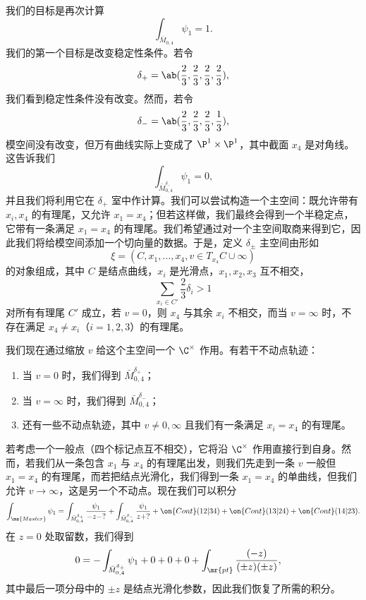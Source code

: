 \begin{exm}[又一个玩具例子]
    我们的目标是再次计算
    \[ \int_{\bar{M}_{0,4}} \psi_1 = 1. \]
    我们的第一个目标是改变稳定性条件。若令
    \[ \delta_+ = \ab(\frac{2}{3}, \frac{2}{3}, \frac{2}{3}, \frac{2}{3}), \]
    我们看到稳定性条件没有改变。然而，若令
    \[ \delta_- = \ab(\frac{2}{3}, \frac{2}{3}, \frac{2}{3}, \frac{1}{3}), \]
    模空间没有改变，但万有曲线实际上变成了 \(\P^1 \times \P^1\)，其中截面 \(x_4\) 是对角线。这告诉我们
    \[ \int_{\bar{M}_{0,4}^{\delta_-}} \psi_1 = 0, \]
    并且我们将利用它在 \(\delta_+\) 室中作计算。我们可以尝试构造一个主空间：既允许带有 \(x_i, x_4\) 的有理尾，又允许 \(x_1 = x_4\)；但若这样做，我们最终会得到一个半稳定点，它带有一条满足 \(x_1 = x_4\) 的有理尾。我们希望通过对一个主空间取商来得到它，因此我们将给模空间添加一个切向量的数据。于是，定义 \(\delta_{\pm}\) 主空间由形如
    \[ \xi = (C, x_1, \ldots, x_4, v \in T_{x_4} C \cup \infty) \]
    的对象组成，其中 \(C\) 是结点曲线，\(x_i\) 是光滑点，\(x_1, x_2, x_3\) 互不相交，
    \[ \sum_{x_i \in C'} \frac{2}{3} \delta_i > 1 \]
    对所有有理尾 \(C'\) 成立，若 \(v = 0\)，则 \(x_4\) 与其余 \(x_i\) 不相交，而当 \(v = \infty\) 时，不存在满足 \(x_4 \neq x_i\)（\(i = 1,2,3\)）的有理尾。 

    我们现在通过缩放 \(v\) 给这个主空间一个 \(\C^{\times}\) 作用。有若干不动点轨迹：
    \begin{enumerate}
        \item 当 \(v = 0\) 时，我们得到 \(\bar{M}_{0,4}^{\delta_+}\)；
        \item 当 \(v = \infty\) 时，我们得到 \(\bar{M}_{0,4}^{\delta_-}\)；
        \item 还有一些不动点轨迹，其中 \(v \neq 0,\infty\) 且我们有一条满足 \(x_i = x_4\) 的有理尾。
    \end{enumerate}

    若考虑一个一般点（四个标记点互不相交），它将沿 \(\C^{\times}\) 作用直接行到自身。然而，若我们从一条包含 \(x_1\) 与 \(x_4\) 的有理尾出发，则我们先走到一条 \(v\) 一般但 \(x_1 = x_4\) 的有理尾，而若把结点光滑化，我们得到一条 \(x_1 = x_4\) 的单曲线，但我们允许 \(v \to \infty\)，这是另一个不动点。现在我们可以积分
    \begin{align*}
        \int_{\ms{Master}} \psi_1 = \int_{\bar{M}_{0,4}^{\delta_+}} \frac{\psi_1}{-z-?} + \int_{\bar{M}_{0,4}^{\delta_-}} \frac{\psi_1}{z+?} + \on{Cont}(12|34) + \on{Cont}(13|24) + \on{Cont}(14|23).
    \end{align*}
    在 \(z = 0\) 处取留数，我们得到
    \begin{align*}
        0 &= - \int_{\bar{M}_{0,4}^{\delta_+}} \psi_1 + 0 + 0 + 0 + \int_{\mr{pt}} \frac{(-z)}{(\pm z)(\pm z)},
    \end{align*}
    其中最后一项分母中的 \(\pm z\) 是结点光滑化参数，因此我们恢复了所需的积分。
\end{exm}

